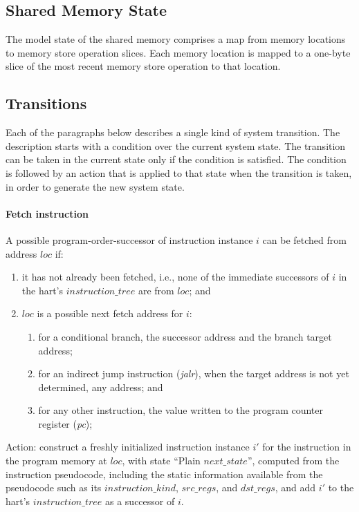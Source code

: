 \subsection{Shared Memory State}
The model state of the shared memory comprises a map from memory locations to memory store operation slices.
Each memory location is mapped to a one-byte slice of the most recent memory store operation to that location.

\subsection{Transitions}\label{sec:omm:transitions}

Each of the paragraphs below describes a single kind of system transition.
The description starts with a condition over the current system state.
The transition can be taken in the current state only if the condition is satisfied.
The condition is followed by an action that is applied to that state when the transition is taken, in order to generate the new system state.

\paragraph{Fetch instruction}\label{omm:fetch}
A possible program-order-successor of instruction instance $i$ can be fetched from address $loc$ if:
\begin{enumerate}
\item it has not already been fetched, i.e., none of the immediate successors of $i$ in the hart's $instruction\_tree$ are from $loc$; and
\item $loc$ is a possible next fetch address for $i$:
  \begin{enumerate}
  \item for a conditional branch, the successor address and the branch target address;
  \item for an indirect jump instruction ({\em jalr}), when the target address is not yet determined, any address; and
  \item for any other instruction, the value written to the program counter register ({\em pc});
  \end{enumerate}
\end{enumerate}

Action: construct a freshly initialized instruction instance $i'$ for the instruction in the program memory at $loc$, with state ``{\sc Plain} $next\_state$'', computed from the instruction pseudocode, including the static information available from the pseudocode such as its $instruction\_kind$, $src\_regs$, and $dst\_regs$, and add $i'$ to the hart's $instruction\_tree$ as a successor of $i$.

